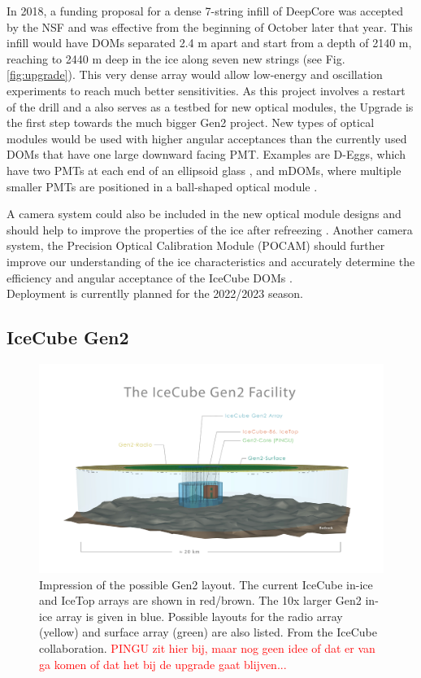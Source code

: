 In 2018, a funding proposal for a dense 7-string infill of DeepCore was accepted by the NSF and was effective from the beginning of October later that year. This infill would have DOMs separated 2.4 m apart and start from a depth of 2140 m, reaching to 2440 m deep in the ice along seven new strings (see Fig. \ref{fig:upgrade}). This very dense array would allow low-energy and oscillation experiments to reach much better sensitivities. As this project involves a restart of the drill and a also serves as a testbed for new optical modules, the Upgrade is the first step towards the much bigger Gen2 project. New types of optical modules would be used with higher angular acceptances than the currently used DOMs that have one large downward facing PMT. Examples are D-Eggs, which have two PMTs at each end of an ellipsoid glass \cite{Ishihara:2017vxn}, and mDOMs, where multiple smaller PMTs are positioned in a ball-shaped optical module \cite{Classen:2017sng}. 

A camera system could also be included in the new optical module designs and should help to improve the properties of the ice after refreezing \cite{Collaboration:2017chl}. Another camera system, the Precision Optical Calibration Module (POCAM) should further improve our understanding of the ice characteristics and accurately determine the efficiency and angular acceptance of the IceCube DOMs \cite{Resconi:2017mad}.\\
\newline
Deployment is currentlly planned for the 2022/2023 season.

\subsection{IceCube Gen2}
\begin{figure}[ht]
\centering
\includegraphics[width=\textwidth]{chapter5/img/gen2_structure.jpg}
\caption{Impression of the possible Gen2 layout. The current IceCube in-ice and IceTop arrays are shown in red/brown. The 10x larger Gen2 in-ice array is given in blue. Possible layouts for the radio array (yellow) and surface array (green) are also listed. From the IceCube collaboration. \textcolor{red}{PINGU zit hier bij, maar nog geen idee of dat er van ga komen of dat het bij de upgrade gaat blijven...}}
\label{fig:gen2}
\end{figure}

